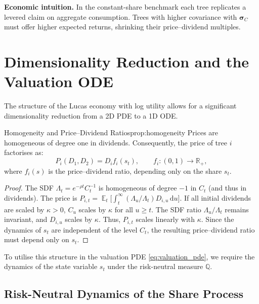﻿\documentclass[11pt,letterpaper,oneside]{article}
\numberwithin{equation}{section}
\DeclareMathOperator{\E}{\mathbb{E}}
\newcommand{\R}{\mathbb{R}}
\newcommand{\1}{\mathbf{1}}
\newcommand{\diff}{\mathrm{d}}
\begin{document}
\begin{tcolorbox}[didacticstyle]
\textbf{Economic intuition.} In the constant-share benchmark each tree replicates a levered claim on aggregate consumption. Trees with higher covariance with $\bm{\sigma}_C$ must offer higher expected returns, shrinking their price--dividend multiples.
\end{tcolorbox}

\section{Dimensionality Reduction and the Valuation ODE}\label{sec:reduction}

The structure of the Lucas economy with log utility allows for a significant dimensionality reduction from a 2D PDE to a 1D ODE.

\begin{proposition}{Homogeneity and Price--Dividend Ratios}{prop:homogeneity}
Prices are homogeneous of degree one in dividends. Consequently, the price of tree $i$ factorises as:
\begin{equation}\label{eq:pd_ratio}
  P_i(D_1,D_2) = D_i f_i(s_t), \qquad f_i:(0,1)\to\R_+,
\end{equation}
where $f_i(s)$ is the price--dividend ratio, depending only on the share $s_t$.
\end{proposition}
\begin{proof}
The SDF $\Lambda_t=e^{-\rho t}C_t^{-1}$ is homogeneous of degree $-1$ in $C_t$ (and thus in dividends). The price is $P_{i,t} = \E_t\big[\int_t^\infty (\Lambda_u/\Lambda_t) D_{i,u}\,\diff u\big]$. If all initial dividends are scaled by $\kappa>0$, $C_u$ scales by $\kappa$ for all $u\ge t$. The SDF ratio $\Lambda_u/\Lambda_t$ remains invariant, and $D_{i,u}$ scales by $\kappa$. Thus, $P_{i,t}$ scales linearly with $\kappa$. Since the dynamics of $s_t$ are independent of the level $C_t$, the resulting price--dividend ratio must depend only on $s_t$.
\end{proof}

To utilise this structure in the valuation PDE \eqref{eq:valuation_pde}, we require the dynamics of the state variable $s_t$ under the risk-neutral measure $\mathbb{Q}$.

\subsection{Risk-Neutral Dynamics of the Share Process}
\end{document}
